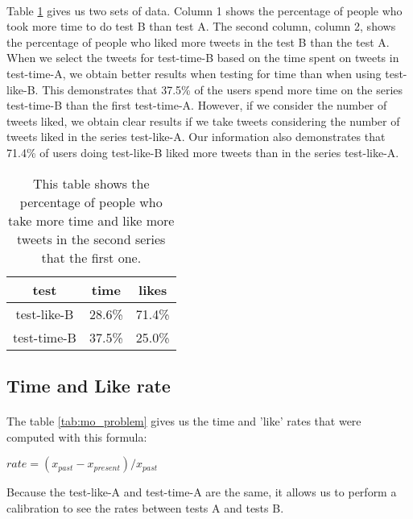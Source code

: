 \paragraph{}
Table \ref{tab:mo_money} gives us two sets of data. Column 1 shows the percentage of people who took more time to do test B than test A. The second column, column 2, shows the percentage of people who liked more tweets in the test B than the test A.\\
When we select the tweets for test-time-B based on the time spent on tweets in test-time-A, we obtain better results when testing for time than when using test-like-B. This demonstrates that 37.5\% of the users spend more time on the series test-time-B than the first test-time-A. However, if we consider the number of tweets liked, we obtain clear results if we take tweets considering the number of tweets liked in the series test-like-A. Our information also demonstrates that 71.4\% of users doing test-like-B liked more tweets than in the series test-like-A.

\begin{table}[h]
\centering
\begin{tabular}{ccc}
\toprule
test & time & likes \\ 
\midrule
test-like-B & 28.6\%	& 71.4\% \\
test-time-B & 37.5\% & 25.0\% \\
\bottomrule 
\end{tabular}
\caption[More time \& likes]{This table shows the percentage of people who take more time and like more tweets in the second series that the first one.}
\label{tab:mo_money}
\end{table}

\subsection{Time and Like rate}

\paragraph{}
The table \ref{tab:mo_problem} gives us the time and 'like' rates that were computed with this formula:

\begin{center}
$rate={(x_{past}-x_{present})}/{x_{past}}$
\end{center}

Because the test-like-A and test-time-A are the same, it allows us to perform a calibration to see the rates between tests A and tests B.

